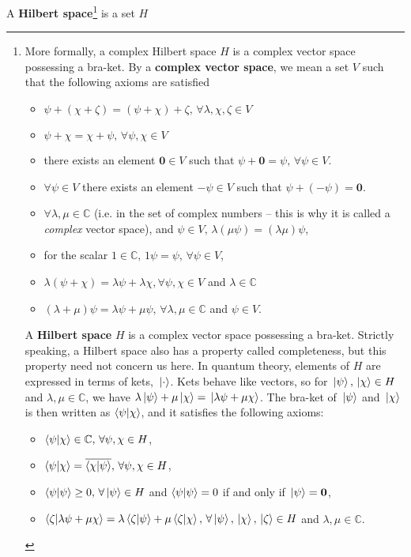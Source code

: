 A \textbf{Hilbert space}\footnote{More formally, a complex Hilbert space $H$ is a complex vector space possessing a bra-ket. By a \textbf{complex vector space}, we mean a set $V$ such that the following axioms are satisfied 
\begin{itemize}[topsep=0pt]
\item $\psi+(\chi+\zeta)=(\psi+\chi)+\zeta,\,\forall \lambda, \chi,\zeta\in V$
\item $\psi+\chi=\chi+\psi,\,\forall \psi,\chi\in V$
\item there exists an element $\bm{0}\in V$ such that $\psi+\bm{0}=\psi,\,\forall\psi\in V$.
\item $\forall \psi\in V$ there exists an element $-\psi\in V$ such that $\psi+(-\psi)=\bm{0}$.
\item $\forall \lambda,\mu\in\mathbb{C}$ (i.e. in the set of complex numbers -- this is why it is called a \emph{complex} vector space), and $\psi\in V,\,\lambda(\mu\psi)=(\lambda\mu)\psi$,
\item for the scalar $1\in\mathbb{C},\, 1\psi=\psi,\,\forall\psi\in V$,
\item $\lambda(\psi+\chi)=\lambda\psi+\lambda\chi,\forall\psi,\chi\in V$ and $\lambda\in\mathbb{C}$
\item $(\lambda+\mu)\psi=\lambda\psi+\mu\psi,\,\forall \lambda,\mu\in \mathbb{C}$ and $\psi\in V.$
\end{itemize}
A \textbf{Hilbert space} $H$ is a complex vector space possessing a bra-ket. Strictly speaking, a Hilbert space also has a property called completeness, but this property need not concern us here. In quantum theory, elements of $H$ are expressed in terms of kets, $\ket*{\cdot}$. Kets behave like vectors, so for $\ket*{\psi},\ket*{\chi}\in H$ and $\lambda,\mu\in\mathbb{C}$, we have $\lambda\ket*{\psi}+\mu\ket*{\chi}=\ket*{\lambda\psi+\mu\chi}$. The bra-ket of $\ket*{\psi}$ and $\ket*{\chi}$ is then written as $\ip{\psi}{\chi}$, and it satisfies the following axioms:
\begin{itemize}[topsep=0pt]
\item $\ip{\psi}{\chi}\in\mathbb{C},\,\forall\psi,\chi\in H$,
\item $\ip{\psi}{\chi}=\overline{\ip{\chi}{\psi}},\,\forall\psi,\chi\in H$,
\item $\ip{\psi}{\psi}\geq 0,\, \forall \ket*{\psi}\in H$ and $\ip{\psi}{\psi}=0$ if and only if $\ket*{\psi}=\bm{0}$,
\item $\ip{\zeta}{\lambda\psi+\mu\chi}=\lambda\ip{\zeta}{\psi}+\mu\ip{\zeta}{\chi},\,\forall \ket*{\psi},\ket*{\chi},\ket*{\zeta}\in H$ and  $\lambda,\mu\in\mathbb{C}$.
\end{itemize}} is a set $H$ %
